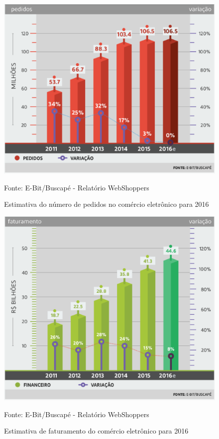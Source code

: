 \documentclass[a4paper,12pt]{monografia}
\begin{document}
\begin{figure}[H]
\centering
\includegraphics[width=12cm]{img/webshoppers/estimativa-pedidos.eps}
\caption{Estimativa do número de pedidos no comércio eletrônico para 2016}
\small{Fonte: E-Bit/Buscapé - Relatório WebShoppers}
\label{figura:estimativa:pedidos}
\end{figure}

\begin{figure}[H]
\centering
\includegraphics[width=12cm]{img/webshoppers/estimativa-faturamento.eps}
\caption{Estimativa de faturamento do comércio eletrônico para 2016}
\small{Fonte: E-Bit/Buscapé - Relatório WebShoppers}
\label{figura:estimativa:faturamento}
\end{figure}
\end{document}
